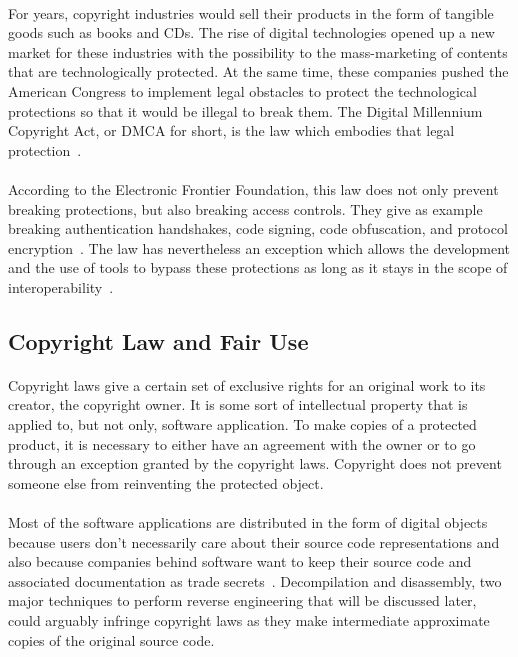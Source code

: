 \paragraph{} 
For years, copyright industries would sell their products in the form of tangible goods such as books and CDs. The rise of digital technologies opened up a new market for these industries with the possibility to the mass-marketing of contents that are technologically protected. At the same time, these companies pushed the American Congress to implement legal obstacles to protect the technological protections so that it would be illegal to break them. The Digital Millennium Copyright Act, or DMCA for short, is the law which embodies that legal protection~\cite{samuelson2002law}.  

\paragraph{}
According to the Electronic Frontier Foundation, this law does not only prevent breaking protections, but also breaking access controls. They give as example breaking authentication handshakes, code signing, code obfuscation, and protocol encryption~\cite{relawdaq}. The law has nevertheless an exception which allows the development and the use of tools to bypass these protections as long as it stays in the scope of interoperability~\cite{samuelson2002law}.

\subsection{Copyright Law and Fair Use} \label{copyright_law_and_fair_use}
\paragraph{}
Copyright laws give a certain set of exclusive rights for an original work to its creator, the copyright owner. It is some sort of intellectual property that is applied to, but not only, software application. To make copies of a protected product, it is necessary to either have an agreement with the owner or to go through an exception granted by the copyright laws. Copyright does not prevent someone else from reinventing the protected object.

\paragraph{}
Most of the software applications are distributed in the form of digital objects because users don't necessarily care about their source code representations and also because companies behind software want to keep their source code and associated documentation as trade secrets~\cite{litman1992copyright}. Decompilation and disassembly, two major techniques to perform reverse engineering that will be discussed later, could arguably infringe copyright laws as they make intermediate approximate copies of the original source code. 


